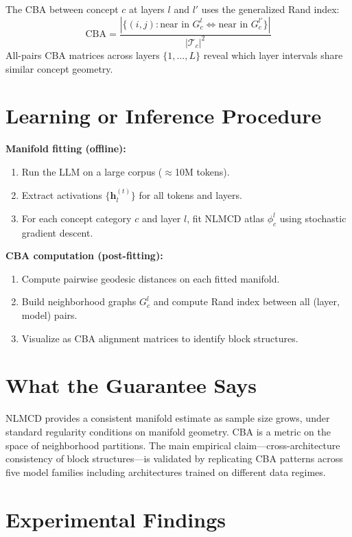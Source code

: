 \documentclass[10pt,twocolumn]{article}
\begin{document}
The CBA between concept $c$ at layers $l$ and $l'$ uses the generalized Rand index:
\[
\text{CBA} = \frac{|\{(i,j): \text{near in }G_c^l \Leftrightarrow \text{near in }G_c^{l'}\}|}{|\mathcal{T}_c|^2}
\]
All-pairs CBA matrices across layers $\{1, \ldots, L\}$ reveal which layer intervals
share similar concept geometry.

\section{Learning or Inference Procedure}

\textbf{Manifold fitting (offline):}
\begin{enumerate}[itemsep=2pt,parsep=0pt]
  \item Run the LLM on a large corpus ($\approx$10M tokens).
  \item Extract activations $\{\mathbf{h}_l^{(t)}\}$ for all tokens and layers.
  \item For each concept category $c$ and layer $l$, fit NLMCD atlas $\phi_c^l$
    using stochastic gradient descent.
\end{enumerate}

\textbf{CBA computation (post-fitting):}
\begin{enumerate}[itemsep=2pt,parsep=0pt]
  \item Compute pairwise geodesic distances on each fitted manifold.
  \item Build neighborhood graphs $G_c^l$ and compute Rand index between
    all (layer, model) pairs.
  \item Visualize as CBA alignment matrices to identify block structures.
\end{enumerate}

\section{What the Guarantee Says}

NLMCD provides a consistent manifold estimate as sample size grows, under standard
regularity conditions on manifold geometry. CBA is a metric on the space of
neighborhood partitions. The main empirical claim---cross-architecture consistency
of block structures---is validated by replicating CBA patterns across five model
families including architectures trained on different data regimes.

\section{Experimental Findings}
\end{document}
